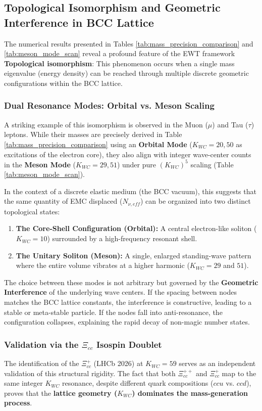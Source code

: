 \documentclass[10pt,a4paper]{article}
\begin{document}
\subsection{Topological Isomorphism and Geometric Interference in BCC Lattice}
\label{subsec:topological_isomorphism}

The numerical results presented in Tables \ref{tab:mass_precision_comparison} and \ref{tab:meson_mode_scan} reveal a profound feature of the EWT framework \textbf{Topological isomorphism}: This phenomenon occurs when a single mass eigenvalue (energy density) can be reached through multiple discrete geometric configurations within the BCC lattice.

\subsubsection{Dual Resonance Modes: Orbital vs. Meson Scaling}
A striking example of this isomorphism is observed in the Muon ($\mu$) and Tau ($\tau$) leptons. While their masses are precisely derived in Table \ref{tab:mass_precision_comparison} using an \textbf{Orbital Mode} ($K_{WC}=20, 50$ as excitations of the electron core), they also align with integer wave-center counts in the \textbf{Meson Mode} ($K_{WC}=29, 51$) under pure $({K_{WC}})^5$ scaling (Table \ref{tab:meson_mode_scan}).

In the context of a discrete elastic medium (the BCC vacuum), this suggests that the same quantity of EMC displaced ($N_{\nu, eff}$) can be organized into two distinct topological states:
\begin{enumerate}
	\item \textbf{The Core-Shell Configuration (Orbital):} A central electron-like soliton ($K_{WC}=10$) surrounded by a high-frequency resonant shell.
	\item \textbf{The Unitary Soliton (Meson):} A single, enlarged standing-wave pattern where the entire volume vibrates at a higher harmonic ($K_{WC}=29$ and $51$).
\end{enumerate}

The choice between these modes is not arbitrary but governed by the \textbf{Geometric Interference} of the underlying wave centers. If the spacing between nodes matches the BCC lattice constants, the interference is constructive, leading to a stable or meta-stable particle. If the nodes fall into anti-resonance, the configuration collapses, explaining the rapid decay of non-magic number states.

\subsubsection{Validation via the $\Xi_{cc}$ Isospin Doublet}
The identification of the $\Xi_{cc}^+$ (LHCb 2026) at $K_{WC}=59$ serves as an independent validation of this structural rigidity. The fact that both $\Xi_{cc}^{++}$ and $\Xi_{cc}^+$ map to the same integer $K_{WC}$ resonance, despite different quark compositions ($ccu$ vs. $ccd$), proves that the \textbf{lattice geometry ($K_{WC}$) dominates the mass-generation process}. 
\end{document}
